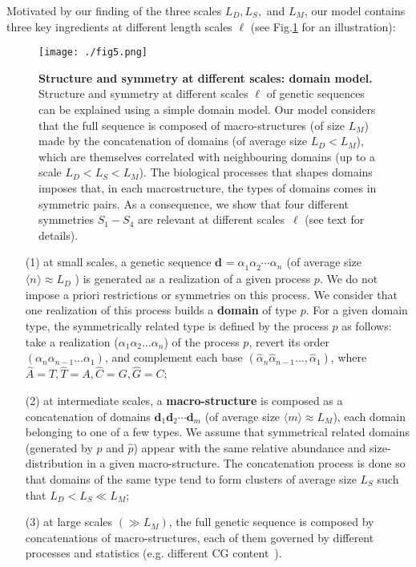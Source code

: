 \documentclass[fleqn,10pt]{wlscirep}
\begin{document}
Motivated by our finding of the three scales $L_D,L_S,$ and $L_M$, our model contains three key ingredients at different length scales $\ell$ (see Fig.\ref{fig.5} for an illustration):
\begin{figure}[ht] 
\centering
\texttt{[image: ./fig5.png]}
\caption{\textbf{Structure and symmetry at different scales: domain model.} Structure and symmetry at different scales $\ell$ of genetic sequences can be explained using a simple domain model. Our model considers that the full sequence is composed of macro-structures (of size $L_M$) made by the concatenation of domains (of average size $L_D<L_M$), which are themselves correlated with neighbouring domains (up to a scale $L_D < L_S < L_M$). The biological processes that shapes domains imposes  that,  in  each macrostructure,  the types of domains comes in symmetric pairs. As a consequence, we show that four different symmetries $S_1-S_4$ are relevant at different scales~$\ell$ (see text for details).
}
\label{fig.5}
\end{figure}
\begin{itemize}

\item[(1)] at small scales, a genetic sequence $ \textbf{d}^{} = \alpha_1^{} \alpha_2^{} \cdots  \alpha_{n_{}}^{}$ (of average size $ \langle n_{} \rangle \approx L_D$ ) is generated  as a realization  of a given process $p$. We do not impose a priori restrictions or symmetries on this process. We consider that one realization of this process builds a {\bf domain} of type $p$. For a given domain type, the symmetrically related type is defined by the process $\hat{p}$ as follows:  take a realization ($\alpha_1 \alpha_2 \ldots \alpha_n$) of the process $p$, revert its order $(\alpha_n  \alpha_{n-1}  \ldots \alpha_1)$, and complement each base $(\hat{\alpha}_n \hat{\alpha}_{n-1} \ldots, \hat{\alpha}_1)$, where $\hat{A}=T, \hat{T}=A,\hat{C}=G,\hat{G}=C$;

\item[(2)] at intermediate scales,  a {\bf macro-structure}  is composed as a  concatenation of domains $\textbf{d}_1 \textbf{d}_2 \cdots  \textbf{d}_{m}$ (of average size $\langle m \rangle \approx L_M$),  each domain belonging to one of a few types. We assume that symmetrical related domains (generated by $p$ and $\hat{p}$) appear with the same relative abundance and  size-distribution in a given macro-structure. The concatenation process is done so that domains of the same type tend to form clusters of average size $L_{S}$ such that $L_D<L_{S} \ll L_M$;

\item[(3)] at large scales  $(\gg L_M)$, the full genetic sequence is composed by  concatenations of  macro-structures, each of them governed by different processes and statistics (e.g. different CG content~\cite{PBHSSG93,BGRO96}).
\end{itemize}
\end{document}
